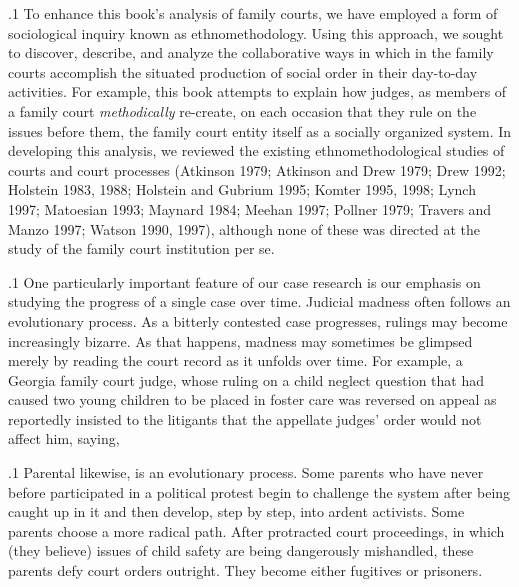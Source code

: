 \documentclass[11pt, twoside]{article}
\begin{document}
{\p.1{%
To enhance this book’s analysis of family courts, we have employed
a form of sociological inquiry known as ethnomethodology. Using this
approach, we sought to discover, describe, and analyze the collaborative
ways in which  in the family courts accomplish the
situated production of social order in their day-to-day activities. For
example, this book attempts to explain how judges, as members of a family court  \textit{methodically} re-create, on each occasion that they
rule on the issues before them, the family court entity itself as a socially
organized system. In developing this analysis, we reviewed the existing
ethnomethodological studies of courts and court processes (Atkinson
1979; Atkinson and Drew 1979; Drew 1992; Holstein 1983, 1988; Holstein and Gubrium 1995; Komter 1995, 1998; Lynch 1997; Matoesian
1993; Maynard 1984; Meehan 1997; Pollner 1979; Travers and Manzo
1997; Watson 1990, 1997), although none of these was directed at the
study of the family court institution per se.
}%

\p.1{%
One particularly important feature of our case research is our emphasis on studying the progress of a single case over time. Judicial
madness often follows an evolutionary process. As a bitterly contested
case progresses, rulings may become increasingly bizarre. As that happens, madness may sometimes be glimpsed merely by reading the court
record as it unfolds over time. For example, a Georgia family court
judge, whose ruling on a child neglect question that had caused two
young children to be placed in foster care was reversed on appeal as  reportedly insisted to the litigants that the appellate judges’ order would
not affect him, saying, 
}%

\p.1{%
Parental  likewise, is an evolutionary process. Some parents
who have never before participated in a political protest begin to challenge the system after being caught up in it and then develop, step by
step, into ardent activists. Some parents choose a more radical path.
After protracted court proceedings, in which (they believe) issues of
child safety are being dangerously mishandled, these parents defy court
orders outright. They become either fugitives or prisoners.
}%

}
\end{document}
